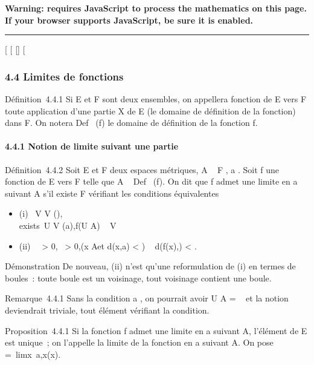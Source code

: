 \textbf{Warning: 
requires JavaScript to process the mathematics on this page.\\ If your
browser supports JavaScript, be sure it is enabled.}

\begin{center}\rule{3in}{0.4pt}\end{center}

{[}
{[}
{[}{]}
{[}

\subsubsection{4.4 Limites de fonctions}

Définition~4.4.1 Si E et F sont deux ensembles, on appellera fonction de
E vers F toute application d'une partie X de E (le domaine de définition
de la fonction) dans F. On notera Def~ (f) le
domaine de définition de la fonction f.

\paragraph{4.4.1 Notion de limite suivant une partie}

Définition~4.4.2 Soit E et F deux espaces métriques, A \subset~ F , a
\in\overlineA. Soit f une fonction de E vers F telle
que A \subset~ Def~ (f). On dit que f admet une limite
en a suivant A s'il existe \ell \in F vérifiant les conditions équivalentes

\begin{itemize}
\itemsep1pt\parskip0pt
\item
  (i) \forall~V \in V (\ell), \\exists~U
  \in V (a),\quad f(U \bigcap A) \subset~ V
\item
  (ii) \forall~~\epsilon \textgreater{} 0,
  \exists~\eta \textgreater{} 0,\quad (x
  \in A\text et d(x,a) \textless{} \eta) \rigtharrow~ d(f(x),\ell)
  \textless{} \epsilon.
\end{itemize}

Démonstration De nouveau, (ii) n'est qu'une reformulation de (i) en
termes de boules~: toute boule est un voisinage, tout voisinage contient
une boule.

Remarque~4.4.1 Sans la condition a \in\overlineA, on
pourrait avoir U \bigcap A = \varnothing~ et la notion deviendrait triviale, tout élément
\ell vérifiant la condition.

Proposition~4.4.1 Si la fonction f admet une limite en a suivant A,
l'élément \ell de E est unique~; on l'appelle la limite de la fonction en a
suivant A. On pose \ell =\
limx\rightarrow~a,x\inAf(x).

